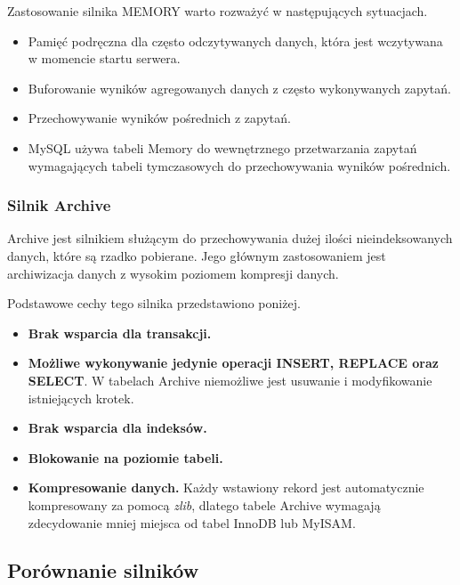 Zastosowanie silnika MEMORY warto rozważyć w następujących sytuacjach.
\begin{itemize}
	\item Pamięć podręczna dla często odczytywanych danych, która jest wczytywana w momencie startu serwera.
	\item Buforowanie wyników agregowanych danych z często wykonywanych zapytań.
	\item Przechowywanie wyników pośrednich z zapytań.
	\item MySQL używa tabeli Memory do wewnętrznego przetwarzania zapytań wymagających tabeli tymczasowych do przechowywania wyników pośrednich.
\end{itemize}

\subsubsection{Silnik Archive}
Archive jest silnikiem służącym do przechowywania dużej ilości nieindeksowanych danych, które są rzadko pobierane. Jego głównym zastosowaniem jest archiwizacja danych z wysokim poziomem kompresji danych.

Podstawowe cechy tego silnika przedstawiono poniżej.
\begin{itemize}
	\item \textbf{Brak wsparcia dla transakcji.}
	\item \textbf{Możliwe wykonywanie jedynie operacji INSERT, REPLACE oraz SELECT}. W tabelach Archive niemożliwe jest usuwanie i modyfikowanie istniejących krotek.
	\item \textbf{Brak wsparcia dla indeksów.}
	\item \textbf{Blokowanie na poziomie tabeli.}
	\item \textbf{Kompresowanie danych.} Każdy wstawiony rekord jest automatycznie kompresowany za pomocą \textit{zlib}, dlatego tabele Archive wymagają zdecydowanie mniej miejsca od tabel InnoDB lub MyISAM.
\end{itemize}


\subsection{Porównanie silników}



